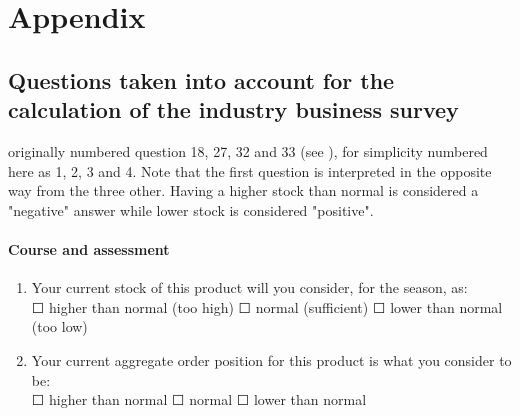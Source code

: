 \documentclass[12pt,a4paper,oneside]{book}
\begin{document}
\nocite{binder_business_1995}
\nocite{dresse_survey_2008}
\nocite{lemasson_enquete_2017}
\nocite{mevik_uncertainty_2004}



 


  
\begin{appendix}
  \listoffigures
  \listoftables
\end{appendix}


\chapter*{Appendix}

\section*{Questions taken into account for the calculation of the industry business survey}
\label{Appendix: Question NS975 description}

originally numbered question 18, 27, 32 and 33 (see ), for simplicity numbered here as 1, 2, 3 and 4.
Note that the first question is interpreted in the opposite way from the three other. Having a higher stock than normal is considered a "negative" answer while lower stock is considered "positive".


\subsubsection*{Course and assessment}
\begin{enumerate}
    \item Your current stock of this product will you consider, for the season, as: \\
    $\Square$ higher than normal (too high) $\Square$ normal (sufficient) $\Square$ lower than normal (too low)
    
    \item Your current aggregate order position for this product is what you consider to be: \\
    $\Square$ higher than normal $\Square$ normal $\Square$ lower than normal
\end{enumerate}
\end{document}
